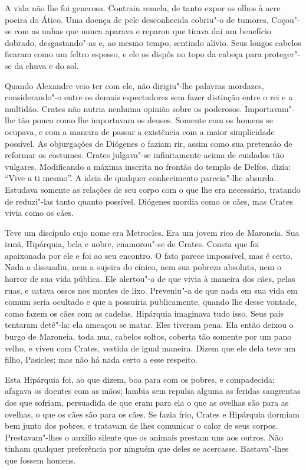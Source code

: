 A vida não lhe foi generosa. Contraiu remela, de tanto expor os olhos à
acre poeira do Ático. Uma doença de pele desconhecida cobriu"-o de tumores.
Coçou"-se com as unhas que nunca aparava e reparou que tirava daí um
benefício dobrado, desgastando"-as e, ao mesmo tempo, sentindo alívio. Seus
longos cabelos ficaram como um feltro espesso, e ele os dispôs no topo da
cabeça para proteger"-se da chuva e do sol.

Quando Alexandre veio ter com ele, não dirigiu"-lhe palavras mordazes,
considerando"-o entre os demais espectadores sem fazer distinção entre o
rei e a multidão. Crates não nutria nenhuma opinião sobre os poderosos.
Importavam"-lhe tão pouco como lhe importavam os deuses. Somente com os
homens se ocupava, e com a maneira de passar a existência com a maior
simplicidade possível. As objurgações de Diógenes o faziam rir, assim como
sua pretensão de reformar os costumes. Crates julgava"-se infinitamente
acima de cuidados tão vulgares. Modificando a máxima inscrita no frontão
do templo de Delfos, dizia: “Vive a ti mesmo”. A ideia de qualquer
conhecimento parecia"-lhe absurda. Estudava somente as relações de seu
corpo com o que lhe era necessário, tratando de reduzi"-las tanto quanto
possível. Diógenes mordia como os cães, mas Crates vivia como os cães.

Teve um discípulo cujo nome era Metrocles. Era um jovem rico de Maroneia.
Sua irmã, Hipárquia, bela e nobre, enamorou"-se de Crates. Consta que foi
apaixonada por ele e foi ao seu encontro. O fato parece impossível, mas é
certo. Nada a dissuadiu, nem a sujeira do cínico, nem sua pobreza
absoluta, nem o horror de sua vida pública. Ele alertou"-a de que vivia à
maneira dos cães, pelas ruas, e catava ossos nos montes de lixo.
Preveniu"-a de que nada em sua vida em comum seria ocultado e que a
possuiria publicamente, quando lhe desse vontade, como fazem os cães com
as cadelas. Hipárquia imaginava tudo isso. Seus pais tentaram detê"-la: ela
ameaçou se matar. Eles tiveram pena. Ela então deixou o burgo de Maroneia,
toda nua, cabelos soltos, coberta tão somente por um pano velho, e viveu
com Crates, vestida de igual maneira. Dizem que ele dela teve um filho,
Pasicles; mas não há nada certo a esse respeito.

Esta Hipárquia foi, ao que dizem, boa para com os pobres, e compadecida;
afagava os doentes com as mãos; lambia sem repulsa alguma as feridas
sangrentas dos que sofriam, persuadida de que eram para ela o que as
ovelhas são para as ovelhas, o que os cães são para os cães. Se fazia
frio, Crates e Hipárquia dormiam bem junto dos pobres, e tratavam de lhes
comunicar o calor de seus corpos. Prestavam"-lhes o auxílio silente que os
animais prestam uns aos outros. Não tinham qualquer preferência por
ninguém que deles se acercasse. Bastava"-lhes que fossem homens.

